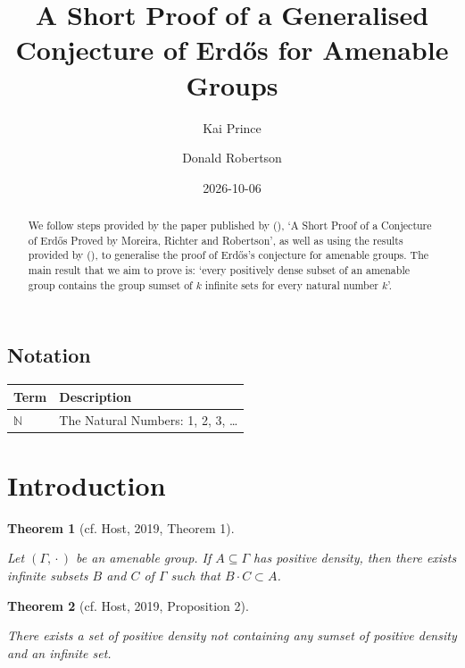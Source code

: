\documentclass[
  british,
]{article}
\title{A Short Proof of a Generalised Conjecture of Erdős for Amenable
Groups}
\author{Kai Prince \and Donald Robertson}
\date{2026-10-06}
\newcounter{none} %
\renewcommand*\contentsname{Table of contents}
\newcommand\contentsname{Table of contents}
\theoremstyle{definition}
\theoremstyle{plain}
\theoremstyle{plain}
\newtheorem{theorem}{Theorem}[section]
\theoremstyle{plain}
\theoremstyle{remark}
\newcommand{\AmenableGroup}{{\Gamma}}
\newcommand{\GroupOperation}[2]{{#1}\cdot{#2}}
\newcommand{\N}{\mathbb{N}}
\begin{document}
\maketitle
\begin{abstract}
We follow steps provided by the paper published by
(), `A Short Proof of a
Conjecture of Erdős Proved by Moreira, Richter and Robertson', as well
as using the results provided by (), to generalise the proof of Erdős's conjecture for amenable
groups. The main result that we aim to prove is: `every positively dense
subset of an amenable group contains the group sumset of \(k\) infinite
sets for every natural number \(k\)'.
\end{abstract}

\renewcommand*\contentsname{Table of contents}
{
\setcounter{tocdepth}{3}
\tableofcontents
}

\subsection*{Notation}\label{sec-Notation}

{\def\LTcaptype{none} %
\begin{longtable}[]{@{}ll@{}}
\toprule\noalign{}
Term & Description \\
\midrule\noalign{}
\endhead
\bottomrule\noalign{}
\endlastfoot
\(\N\) & The Natural Numbers: 1, 2, 3, \ldots{} \\
\end{longtable}
}

\section{Introduction}\label{introduction}

\begin{theorem}[{cf. Host, 2019, Theorem
1}]\protect\hypertarget{thm-GenErdosConjComb}{}\label{thm-GenErdosConjComb}

Let \((\AmenableGroup,\GroupOperation{}{})\) be an amenable group. If
\(A\subseteq\AmenableGroup\) has positive density, then there exists
infinite subsets \(B\) and \(C\) of \(\AmenableGroup\) such that
\(\GroupOperation{B}{C}\subset A\).

\end{theorem}

\begin{theorem}[{cf. Host, 2019, Proposition
2}]\protect\hypertarget{thm-GenErdosConjRel}{}\label{thm-GenErdosConjRel}

There exists a set of positive density not containing any sumset of
positive density and an infinite set.

\end{theorem}
\end{document}

